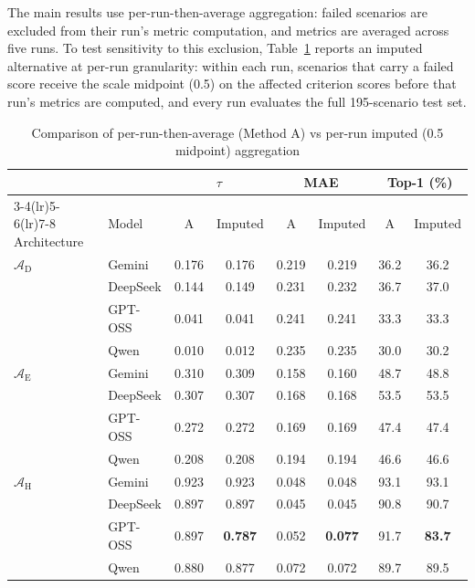 \documentclass[11pt]{article}
\begin{document}
The main results use per-run-then-average aggregation: failed scenarios are excluded from their run's metric computation, and metrics are averaged across five runs. To test sensitivity to this exclusion, Table~\ref{tab:imputed_comparison} reports an imputed alternative at per-run granularity: within each run, scenarios that carry a failed score receive the scale midpoint (0.5) on the affected criterion scores before that run's metrics are computed, and every run evaluates the full 195-scenario test set.

\begin{table}[htbp]
\centering
\small\centering
\caption{Comparison of per-run-then-average (Method A) vs per-run imputed (0.5 midpoint) aggregation}
\label{tab:imputed_comparison}
\begin{tabular}{ll cc cc cc}
\toprule
 & & \multicolumn{2}{c}{$\tau$} & \multicolumn{2}{c}{MAE} & \multicolumn{2}{c}{Top-1 (\%)} \\
\cmidrule(lr){3-4}\cmidrule(lr){5-6}\cmidrule(lr){7-8}
Architecture & Model & A & Imputed & A & Imputed & A & Imputed \\
\midrule
$\mathcal{A}_{\text{D}}$ & Gemini   & 0.176 & 0.176 & 0.219 & 0.219 & 36.2 & 36.2 \\
                         & DeepSeek & 0.144 & 0.149 & 0.231 & 0.232 & 36.7 & 37.0 \\
                         & GPT-OSS  & 0.041 & 0.041 & 0.241 & 0.241 & 33.3 & 33.3 \\
                         & Qwen     & 0.010 & 0.012 & 0.235 & 0.235 & 30.0 & 30.2 \\
\addlinespace
$\mathcal{A}_{\text{E}}$ & Gemini   & 0.310 & 0.309 & 0.158 & 0.160 & 48.7 & 48.8 \\
                         & DeepSeek & 0.307 & 0.307 & 0.168 & 0.168 & 53.5 & 53.5 \\
                         & GPT-OSS  & 0.272 & 0.272 & 0.169 & 0.169 & 47.4 & 47.4 \\
                         & Qwen     & 0.208 & 0.208 & 0.194 & 0.194 & 46.6 & 46.6 \\
\addlinespace
$\mathcal{A}_{\text{H}}$ & Gemini   & 0.923 & 0.923 & 0.048 & 0.048 & 93.1 & 93.1 \\
                         & DeepSeek & 0.897 & 0.897 & 0.045 & 0.045 & 90.8 & 90.7 \\
                         & GPT-OSS  & 0.897 & \textbf{0.787} & 0.052 & \textbf{0.077} & 91.7 & \textbf{83.7} \\
                         & Qwen     & 0.880 & 0.877 & 0.072 & 0.072 & 89.7 & 89.5 \\
\bottomrule
\end{tabular}
\renewcommand{\arraystretch}{1.0}
\end{table}
\end{document}
